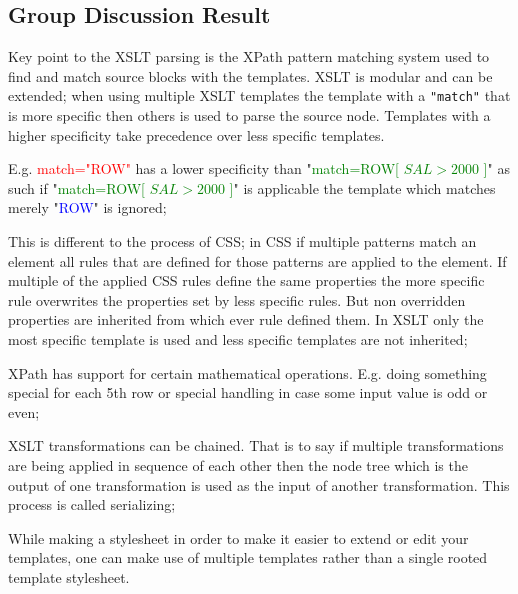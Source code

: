 \subsection{Group Discussion Result}
Key point to the XSLT parsing is the XPath pattern matching system used to find and match source blocks with the templates. XSLT is modular and can be extended; when using multiple XSLT templates the template with a \verb|"match"| that is more specific then others is used to parse the source node. Templates with a higher specificity take precedence over less specific templates. 
	
E.g. \textcolor{red}{match="ROW"} has a lower specificity than "\textcolor{green}{match=ROW[ $SAL > 2000$ ]}" as such if "\textcolor{green}{match=ROW[ $SAL > 2000$ ]}" is applicable the template which matches merely "\textcolor{blue}{ROW}" is ignored;


This is different to the process of CSS; in CSS if multiple patterns match an element all rules that are defined for those patterns are applied to the element. If multiple of the applied CSS rules define the same properties the more specific rule overwrites the properties set by less specific rules. But non overridden properties are inherited from which ever rule defined them. In XSLT only the most specific template is used and less specific templates are not inherited;
	

XPath has support for certain mathematical operations. E.g. doing something special for each 5th row or special handling in case some input value is odd or even;
	

XSLT transformations can be chained. That is to say if multiple transformations are being applied in sequence of each other then the node tree which is the output of one transformation is used as the input of another transformation. This process is called serializing;
	

While making a stylesheet in order to make it easier to extend or edit your templates, one can make use of multiple templates rather than a single rooted template stylesheet.

